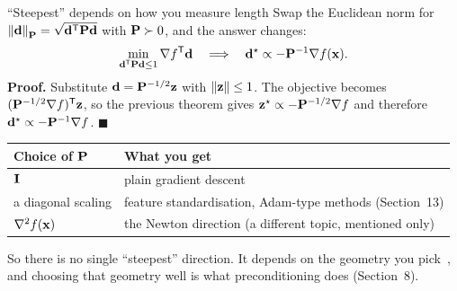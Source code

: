 \begin{frame}{``Steepest'' depends on how you measure length}
  Swap the Euclidean norm for $\left\lVert \mathbf{d} \right\rVert_{\mathbf{P}} = \sqrt{\mathbf{d}^{\mathsf T}\mathbf{P}\mathbf{d}}$ with $\mathbf{P}\succ0$, and the answer changes:
  \[
    \min_{\mathbf{d}^{\mathsf T}\mathbf{P}\mathbf{d}\le1}\nabla f^{\mathsf T}\mathbf{d}
    \quad\Longrightarrow\quad
    \mathbf{d}^\star \propto -\mathbf{P}^{-1}\nabla f(\mathbf{x}).
  \]
  \small\textbf{Proof.} Substitute $\mathbf{d} = \mathbf{P}^{-1/2}\mathbf z$ with $\left\lVert \mathbf z \right\rVert\le1$. The objective becomes
  $(\mathbf{P}^{-1/2}\nabla f)^{\mathsf T}\mathbf z$, so the previous theorem gives $\mathbf z^\star\propto-\mathbf{P}^{-1/2}\nabla f$ and therefore
  $\mathbf{d}^\star\propto-\mathbf{P}^{-1}\nabla f$. $\blacksquare$

  \vspace{4pt}
  \begin{center}
  \begin{tabular}{@{}l l@{}}
    \toprule
    Choice of $\mathbf{P}$ & What you get \\
    \midrule
    $\mathbf{I}$ & plain gradient descent \\
    a diagonal scaling & feature standardisation, Adam-type methods (Section~13) \\
    $\nabla^2 f(\mathbf{x})$ & the Newton direction (a different topic, mentioned only) \\
    \bottomrule
  \end{tabular}
  \end{center}
  \footnotesize\textcolor{mGrey}{So there is no single ``steepest'' direction. It depends on the geometry you pick~\cite{boyd2004},
  and choosing that geometry well is what preconditioning does (Section~8).}
\end{frame}
